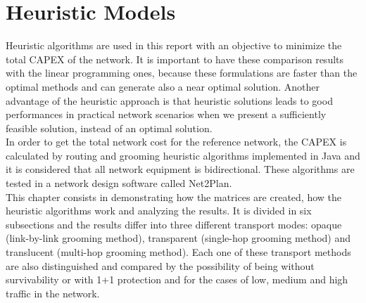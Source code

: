 \chapter{Heuristic Models}

Heuristic algorithms are used in this report with an objective to minimize the total CAPEX of the network. It is important to have these comparison results with the linear programming ones, because these formulations are faster than the optimal methods and can generate also a near optimal solution. Another advantage of the heuristic approach is that heuristic solutions leads to good performances in practical network scenarios when we present a sufficiently feasible solution, instead of an optimal solution.\\
In order to get the total network cost for the reference network, the CAPEX is calculated by routing and grooming heuristic algorithms implemented in Java and it is considered that all network equipment is bidirectional. These algorithms are tested in a network design software called Net2Plan.\\
This chapter consists in demonstrating how the matrices are created, how the heuristic algorithms work and analyzing the results. It is divided in six subsections and the results differ into three different transport modes: opaque (link-by-link grooming method), transparent (single-hop grooming method) and translucent (multi-hop grooming method). Each one of these transport methods are also distinguished and compared by the possibility of being without survivability or with 1+1 protection and for the cases of low, medium and high traffic in the network.




%



